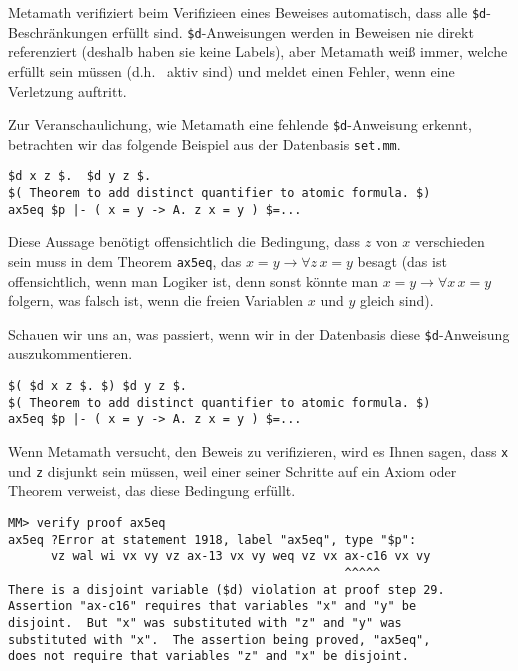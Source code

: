 Metamath verifiziert beim Verifizieen eines Beweises automatisch, dass alle \texttt{\$d}-Beschränkungen erfüllt sind.  \texttt{\$d}-Anweisungen werden in Beweisen nie direkt referenziert (deshalb haben sie keine Labels), aber Metamath weiß immer, welche erfüllt sein müssen (d.h. \ aktiv sind) und meldet einen Fehler, wenn eine Verletzung auftritt.

Zur Veranschaulichung, wie Metamath eine fehlende \texttt{\$d}-Anweisung erkennt, betrachten wir das folgende Beispiel aus der Datenbasis \texttt{set.mm}.

\begin{verbatim}
$d x z $.  $d y z $.
$( Theorem to add distinct quantifier to atomic formula. $)
ax5eq $p |- ( x = y -> A. z x = y ) $=...
\end{verbatim}

Diese Aussage benötigt offensichtlich die Bedingung, dass $z$ von $x$ verschieden sein muss in dem Theorem \texttt{ax5eq}, das  $x=y \rightarrow \forall z \, x=y$ besagt (das ist offensichtlich, wenn man Logiker ist, denn sonst könnte man $x=y \rightarrow \forall x \, x=y$ folgern, was falsch ist, wenn die freien Variablen $x$ und $y$ gleich sind).

Schauen wir uns an, was passiert, wenn wir in der Datenbasis diese \texttt{\$d}-Anweisung auszukommentieren.

\begin{verbatim}
$( $d x z $. $) $d y z $.
$( Theorem to add distinct quantifier to atomic formula. $)
ax5eq $p |- ( x = y -> A. z x = y ) $=...
\end{verbatim}

Wenn Metamath versucht, den Beweis zu verifizieren, wird es Ihnen sagen, dass \texttt{x} und \texttt{z} disjunkt sein müssen, weil einer seiner Schritte auf ein Axiom oder Theorem verweist, das diese Bedingung erfüllt.

\begin{verbatim}
MM> verify proof ax5eq
ax5eq ?Error at statement 1918, label "ax5eq", type "$p":
      vz wal wi vx vy vz ax-13 vx vy weq vz vx ax-c16 vx vy
                                               ^^^^^
There is a disjoint variable ($d) violation at proof step 29.
Assertion "ax-c16" requires that variables "x" and "y" be
disjoint.  But "x" was substituted with "z" and "y" was
substituted with "x".  The assertion being proved, "ax5eq",
does not require that variables "z" and "x" be disjoint.
\end{verbatim}

